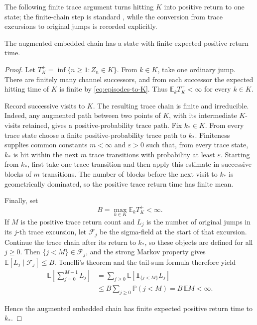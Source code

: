 The following finite trace argument turns hitting \(K\) into positive return
to one state; the finite-chain step is standard \citep{Norris1997}, while the
conversion from trace excursions to original jumps is recorded explicitly.

\begin{proposition}\label{prop:trace}
The augmented embedded chain has a state with finite expected positive return
time.
\end{proposition}

\begin{proof}
Let \(T_K^+=\inf\{n\ge1:Z_n\in K\}\).  From \(k\in K\), take one ordinary
jump.  There are finitely many channel successors, and from each successor
the expected hitting time of \(K\) is finite by \eqref{eq:episodes-to-K}.
Thus \(\mathbb E_kT_K^+<\infty\) for every \(k\in K\).

Record successive visits to \(K\).  The resulting trace chain is finite and
irreducible.  Indeed, any augmented path between two points of \(K\), with
its intermediate \(K\)-visits retained, gives a positive-probability trace
path.  Fix \(k_*\in K\).  From every trace state choose a finite
positive-probability trace path to \(k_*\).  Finiteness supplies common
constants \(m<\infty\) and \(\varepsilon>0\) such that, from every trace
state, \(k_*\) is hit within the next \(m\) trace transitions with probability
at least \(\varepsilon\).  Starting from \(k_*\), first take one trace
transition and then apply this estimate in successive blocks of \(m\)
transitions.  The number of blocks before the next visit to \(k_*\) is
geometrically dominated, so the positive trace return time has finite mean.

Finally, set
\[
  B=\max_{k\in K}\mathbb E_kT_K^+<\infty.
\]
If \(M\) is the positive trace return count and \(L_j\) is the number of
original jumps in its \(j\)-th trace excursion, let \(\mathcal F_j\) be the
sigma-field at the start of that excursion.  Continue the trace chain after
its return to \(k_*\), so these objects are defined for all \(j\ge0\).  Then
\(\{j<M\}\in\mathcal F_j\), and the strong Markov property gives
\(\mathbb E[L_j\mid\mathcal F_j]\le B\).  Tonelli's theorem and the tail-sum
formula therefore yield
\[
\begin{aligned}
  \mathbb E\!\left[\sum_{j=0}^{M-1}L_j\right]
  &=\sum_{j\ge0}\mathbb E\!\left[
      \mathbf1_{\{j<M\}}L_j\right]\\
  &\le B\sum_{j\ge0}\mathbb P(j<M)
   =B\,\mathbb E M<\infty.
\end{aligned}
\]

\noindent
Hence the augmented embedded chain has finite expected positive return time
to \(k_*\).
\end{proof}

